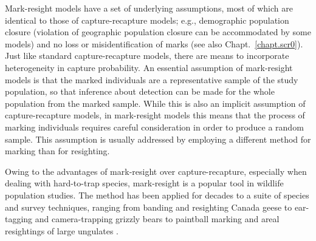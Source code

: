 Mark-resight models have a set of underlying assumptions, most of
which are identical to those of capture-recapture models; e.g.,
demographic population closure (violation of geographic population
closure can be accommodated by some models) and no loss or
misidentification of marks (see also Chapt.~\ref{chapt.scr0}).  Just
like standard capture-recapture models, there are means to incorporate
heterogeneity in capture probability. An essential assumption of
mark-resight models is that the marked individuals are a
representative sample of the study population, so that inference about
detection can be made for the whole population from the marked
sample. While this is also an implicit assumption of capture-recapture
models, in mark-resight models this means that the process of marking
individuals requires careful consideration in order to produce a
random sample.  This assumption is usually addressed by employing a
different method for marking than for resighting.


Owing to the advantages of mark-resight over capture-recapture,
especially when dealing with hard-to-trap species, mark-resight is a
popular tool in wildlife population studies. The method has been
applied for decades
to a suite of species and survey techniques,
ranging from banding and resighting Canada geese
\citep{hestbeck_malecki:1989} to ear-tagging and camera-trapping
grizzly bears \citep{mace_etal:1994} to paintball marking and areal
resightings of large ungulates \citep{skalski_etal:2005jwm}.

